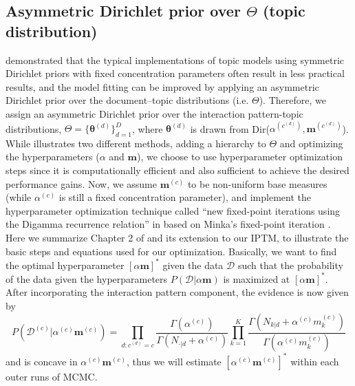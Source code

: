 \documentclass[a4paper]{article}
\begin{document}
 \subsection{Asymmetric Dirichlet prior over $\Theta$ (topic distribution)}  \label{subsec: Asymmetric Dirichlet prior over theta}
 \cite{wallach2009rethinking} demonstrated that the typical implementations of topic models using symmetric Dirichlet priors with fixed concentration parameters often result in less practical results, and the model fitting can be improved by applying an asymmetric Dirichlet prior over the document–topic distributions (i.e. $\Theta$). Therefore, we assign an asymmetric Dirichlet prior over the interaction pattern-topic distributions, $\Theta=\{\boldsymbol{\theta}^{(d)} \}_{d=1}^{D}$, where $\boldsymbol{\theta}^{(d)}$ is drawn from Dir($\alpha^{(c^{(d)})}, \boldsymbol{m}^{(c^{(d)})}$). While \cite{wallach2009rethinking} illustrates two different methods, adding a hierarchy to $\Theta$ and optimizing the hyperparameters ($\alpha$ and $\boldsymbol{m}$), we choose to use hyperparameter
 optimization steps since it is computationally efficient and also sufficient to achieve the desired performance gains. Now, we assume $\boldsymbol{m}^{(c)}$ to be non-uniform base measures (while $\alpha^{(c)}$ is still a fixed concentration parameter), and implement the hyperparameter optimization technique called ``new fixed-point iterations using the Digamma recurrence relation'' in \cite{wallach2008structured} based on Minka’s fixed-point iteration \citep{minka2000estimating}.\\ \newline
 Here we summarize Chapter 2 of \cite{wallach2008structured} and its extension to our IPTM, to illustrate the basic steps and equations used for our optimization. Basically, we want to find the optimal hyperparameter $[\alpha\boldsymbol{m}]^*$ given the data $\mathcal{D}$ such that the probability of the
 data given the hyperparameters $P(\mathcal{D}|\alpha\boldsymbol{m})$ is maximized at $[\alpha\boldsymbol{m}]^*$. After incorporating the interaction pattern component, the evidence is now given by 
 \begin{equation}
 P(\mathcal{D}^{(c)}|\alpha^{(c)}\boldsymbol{m}^{(c)})=\prod_{d:c^{(d)}=c} \frac{\Gamma(\alpha^{(c)})}{\Gamma(N_{\cdot|d}+\alpha^{(c)})}\prod_{k=1}^{K}\frac{\Gamma(N_{k|d}+\alpha^{(c)} m^{(c)}_k)}{\Gamma(\alpha^{(c)} m^{(c)}_k)}
 \end{equation} and is concave in $\alpha^{(c)} \boldsymbol{m}^{(c)}$, thus we will estimate $[\alpha^{(c)}\boldsymbol{m}^{(c)}]^*$ within each outer runs of MCMC.\\
\end{document}
